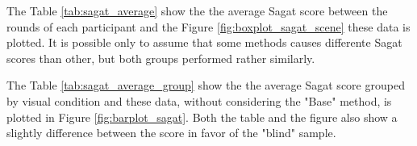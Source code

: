 The Table \ref{tab:sagat_average} show the the average Sagat score between the rounds of each participant and the Figure \ref{fig:boxplot_sagat_scene} these data is plotted. It is possible only to assume that some methods causes differente Sagat scores than other, but both groups performed rather similarly.



%    

The Table \ref{tab:sagat_average_group} show the the average Sagat score grouped by visual condition and these data, without considering the "Base" method, is plotted in Figure \ref{fig:barplot_sagat}. Both the table and the figure also show a slightly difference between the score in favor of the "blind" sample.



%    

